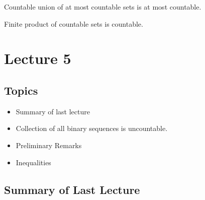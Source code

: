 \documentclass[a4paper]{report}
\begin{document}
\begin{eg}
    
\end{eg}

\begin{eg}[\( \Q  \) is countable]
    
\end{eg}

\begin{theorem}[ ]
   Countable union of at most countable sets is at most countable.
\end{theorem}

\begin{corollary}
    
\end{corollary}

\begin{corollary}
    
\end{corollary}

\begin{theorem}[ ]
   Finite product of countable sets is countable. 
\end{theorem}

\begin{eg}[\( \Q \) is countable]
    
\end{eg}



\section{Lecture 5}

\subsection{Topics}
\begin{itemize}
    \item Summary of last lecture
    \item Collection of all binary sequences is uncountable.
    \item Preliminary Remarks
    \item Inequalities
\end{itemize}

\subsection{Summary of Last Lecture}
\end{document}
